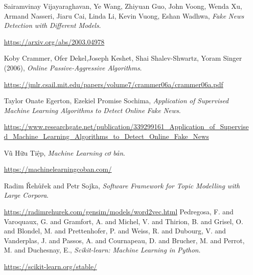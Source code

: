 \documentclass[12pt,a4paper,oneside]{book}
\begin{document}
\newpage
\renewcommand{\bibname}{\bf \LARGE \quad DANH MỤC TÀI LIỆU THAM KHẢO}
\baselineskip
18pt
\begin{thebibliography}{99}
	
	\bibitem{} Sairamvinay Vijayaraghavan, Ye Wang, Zhiyuan Guo, John Voong, Wenda Xu, Armand Nasseri, Jiaru Cai, Linda Li, Kevin Vuong, Eshan Wadhwa,
	\textit{Fake News Detection with Different Models}.
	
	\url{https://arxiv.org/abs/2003.04978}
	
	\bibitem{} Koby Crammer, Ofer Dekel,Joseph Keshet, Shai Shalev-Shwartz, Yoram Singer (2006), \textit{Online Passive-Aggressive Algorithms}.
	
	\url{https://jmlr.csail.mit.edu/papers/volume7/crammer06a/crammer06a.pdf}
	
	\bibitem{}Taylor Onate Egerton, Ezekiel Promise Sochima, \textit{Application of Supervised Machine Learning Algorithms to Detect Online Fake News}.
	
	\url{https://www.researchgate.net/publication/339299161_Application_of_Supervised_Machine_Learning_Algorithms_to_Detect_Online_Fake_News}
	
	\bibitem{} Vũ Hữu Tiệp, \textit{Machine Learning cơ bản}.
	
	
	\url{https://machinelearningcoban.com/}
	
	\bibitem{} Radim {\v R}eh{\r u}{\v r}ek and Petr Sojka, \textit{Software Framework for Topic Modelling with Large Corpora}.
	
	\url{https://radimrehurek.com/gensim/models/word2vec.html}
	\bibitem{}Pedregosa, F. and Varoquaux, G. and Gramfort, A. and Michel, V.
	         and Thirion, B. and Grisel, O. and Blondel, M. and Prettenhofer, P.
	         and Weiss, R. and Dubourg, V. and Vanderplas, J. and Passos, A. and
	         Cournapeau, D. and Brucher, M. and Perrot, M. and Duchesnay, E., \textit{Scikit-learn: Machine Learning in {P}ython}.
	         
	\url{https://scikit-learn.org/stable/}
\end{thebibliography}
\end{document}
